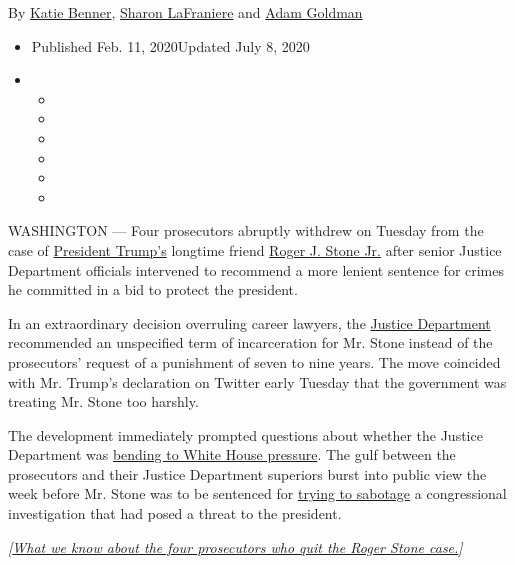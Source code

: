 By \href{https://www.nytimes.com/by/katie-benner}{Katie Benner},
\href{https://www.nytimes.com/by/sharon-lafraniere}{Sharon LaFraniere}
and \href{https://www.nytimes.com/by/adam-goldman}{Adam Goldman}

\begin{itemize}
\item
  Published Feb. 11, 2020Updated July 8, 2020
\item
  \begin{itemize}
  \item
  \item
  \item
  \item
  \item
  \item
  \end{itemize}
\end{itemize}

WASHINGTON --- Four prosecutors abruptly withdrew on Tuesday from the
case of
\href{https://www.nytimes.com/2020/02/12/us/politics/trump-stone.html}{President
Trump's} longtime friend
\href{https://www.nytimes.com/2020/07/08/technology/roger-stone-facebook.html}{Roger
J. Stone Jr.} after senior Justice Department officials intervened to
recommend a more lenient sentence for crimes he committed in a bid to
protect the president.

In an extraordinary decision overruling career lawyers, the
\href{https://www.nytimes.com/2020/02/12/us/politics/trump-stone.html}{Justice
Department} recommended an unspecified term of incarceration for Mr.
Stone instead of the prosecutors' request of a punishment of seven to
nine years. The move coincided with Mr. Trump's declaration on Twitter
early Tuesday that the government was treating Mr. Stone too harshly.

The development immediately prompted questions about whether the Justice
Department was
\href{https://www.nytimes.com/2020/02/12/us/politics/trump-barr-stone.html}{bending
to White House pressure}. The gulf between the prosecutors and their
Justice Department superiors burst into public view the week before Mr.
Stone was to be sentenced for
\href{https://www.nytimes.com/2019/11/15/us/politics/roger-stone-trial-guilty.html}{trying
to sabotage} a congressional investigation that had posed a threat to
the president.

\emph{{[}}\href{https://www.nytimes.com/2020/02/11/us/roger-stone-federal-prosecutors.html}{\emph{What
we know about the four prosecutors who quit the Roger Stone
case.}}\emph{{]}}

